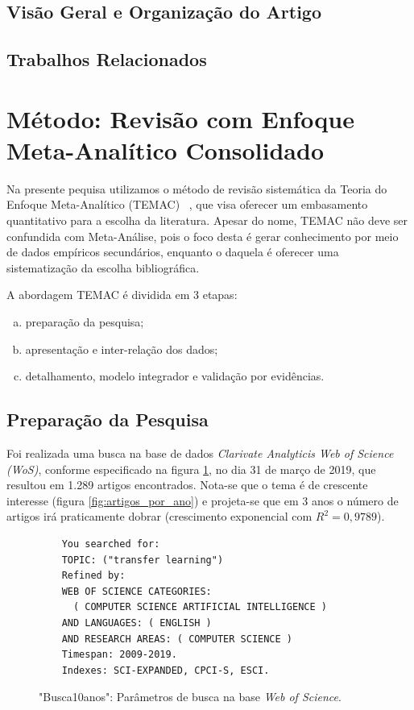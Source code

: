 \documentclass[sigconf]{acmart}
\begin{document}
  \subsection{Visão Geral e Organização do Artigo}
  \lipsum[3]
  \subsection{Trabalhos Relacionados}
  \lipsum[2]
\section{Método: Revisão com Enfoque Meta-Analítico Consolidado}\label{TEMAC}
Na presente pequisa utilizamos o método de revisão sistemática da Teoria do Enfoque Meta-Analítico (TEMAC) ~\cite{Mariano}, que visa oferecer um embasamento quantitativo para a escolha da literatura. Apesar do nome, TEMAC não deve ser confundida com Meta-Análise, pois o foco desta é gerar conhecimento por meio de dados empíricos secundários, enquanto o daquela é oferecer uma sistematização da escolha bibliográfica.

A abordagem TEMAC é dividida em 3 etapas: 
\begin{enumerate}[a)]
  \item preparação da pesquisa;
  \item apresentação e inter-relação dos dados;
  \item detalhamento, modelo integrador e validação por evidências.
\end{enumerate}

\subsection{Preparação da Pesquisa}
Foi realizada uma busca na base de dados \emph{Clarivate Analyticis Web of Science (WoS)}, conforme especificado na figura \ref{card:wos}, no dia 31 de março de 2019, que resultou em 1.289 artigos encontrados. Nota-se que o tema é de crescente interesse (figura \ref{fig:artigos_por_ano}) e projeta-se que em 3 anos o número de artigos irá praticamente dobrar (crescimento exponencial com $R^2=0,9789$). 
\begin{figure}[htp]

\begin{tcolorbox}[colback=yellow!5!white,colframe=gray!75!black,title={Results: 1,289 (from Web of Science Core Collection)}]
  \footnotesize{
    \begin{verbatim}
    You searched for: 
    TOPIC: ("transfer learning")
    Refined by: 
    WEB OF SCIENCE CATEGORIES: 
      ( COMPUTER SCIENCE ARTIFICIAL INTELLIGENCE )
    AND LANGUAGES: ( ENGLISH ) 
    AND RESEARCH AREAS: ( COMPUTER SCIENCE )
    Timespan: 2009-2019. 
    Indexes: SCI-EXPANDED, CPCI-S, ESCI.
    \end{verbatim}
  }

\end{tcolorbox}
\caption{"Busca10anos": Parâmetros de busca na base \emph{Web of Science}.}
\label{card:wos}
\end{figure}
\end{document}
